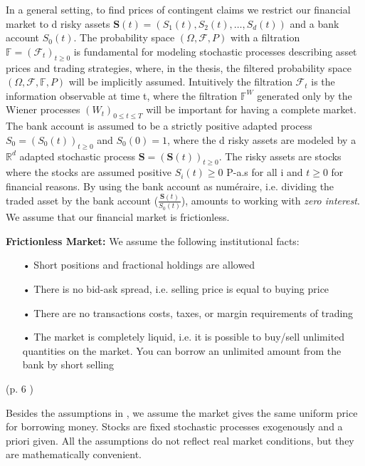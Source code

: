 In a general setting, to find prices of contingent claims we restrict our financial market to d risky assets $\bm{S}(t)=(S_1(t), S_2(t),\ldots, S_d(t))$ and a bank account $S_0(t)$. The probability space $(\Omega, \mathcal{F}, P)$ with a filtration $\mathbb{F}=(\mathcal{F}_t)_{t\geq 0}$ is fundamental for modeling stochastic processes describing asset prices and trading strategies, where, in the thesis, the filtered probability space $(\Omega, \mathcal{F}, \mathbb{F}, P)$ will be implicitly assumed. Intuitively the filtration $\mathcal{F}_t$ is the information observable at time t, where the filtration $\mathbb{F}^{W}$ generated only by the Wiener processes $(W_t)_{0\leq t \leq T}$ will be important for having a complete market.\\

The bank account is assumed to be a strictly positive adapted process $S_0=(S_0 (t))_{t \geq 0}$ and $S_0(0)=1$, where the d risky assets are modeled by a $\mathbb{R}^d$ adapted stochastic process $\bm{S}=(\bm{S}(t))_{t\geq 0}$. The risky assets are stocks where the stocks are assumed positive $S_i(t)\geq 0$ P-a.s for all i and $t\geq 0$ for financial reasons. By using the bank account as numéraire, i.e. dividing the traded asset by the bank account ($\frac{\bm{S}(t)}{S_0 (t)}$), amounts to working with \textit{zero interest}. We assume that our financial market is frictionless.
\theoremstyle{assumption}
\begin{assumption}{\textbf{Frictionless Market: }}\label{EfficientMarket}
We assume the following institutional facts:
\begin{enumerate}
\item[•] Short positions and fractional holdings are allowed
\item[•] There is no bid-ask spread, i.e. selling price is equal to buying price
\item[•] There are no transactions costs, taxes, or margin requirements of trading
\item[•] The market is completely liquid, i.e. it is possible to buy/sell unlimited quantities on the market. You can borrow an unlimited amount from the bank by short selling
\end{enumerate}
\hfill (p. 6 \parencite{finKont})
\end{assumption}
Besides the assumptions in \parencite{finKont}, we assume the market gives the same uniform price for borrowing money. Stocks are fixed stochastic processes exogenously and a priori given. All the assumptions do not reflect real market conditions, but they are mathematically convenient.

